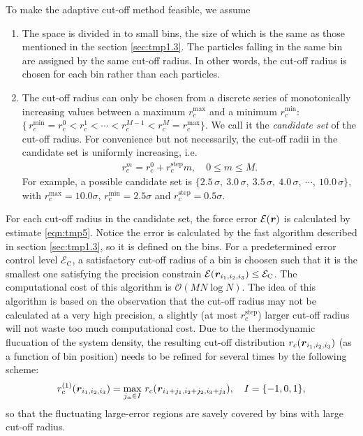 \documentclass[aps,pre,preprint]{revtex4}
\renewcommand{\v}[1]{\textbf{\textit{#1}}}
\begin{document}
To make the adaptive cut-off method feasible, we assume
\begin{enumerate}
\item The space is divided in to small bins, the size of which is the
  same as those mentioned in the section \ref{sec:tmp1.3}.  The
  particles falling in the same bin are assigned by the same cut-off
  radius. In other words, the cut-off radius is chosen for each bin
  rather than each particles.
\item The cut-off radius can only be chosen from a discrete series of
  monotonically increasing values between a maximum 
  $r_c^{\textrm{max}}$ and a minimum 
  $r_c^{\textrm{min}}$: $\{\,r_c^{\textrm{min}} = r_c^0 < r_c^1 <
  \cdots < r_c^{M-1} <r_c^M = r_c^{\textrm{max}}\}$.  We call it the
  \emph{candidate set} of the cut-off radius.  For convenience but not
  necessarily, the cut-off radii in the candidate set is uniformly increasing, i.e.
  \begin{align}
    r_c^m = r_c^0 + r_c^{\textrm{step}} m, \quad 0 \leq m \leq M.
  \end{align}
  For example, a possible candidate set is $\{2.5\,\sigma,\
  3.0\,\sigma,\ 3.5\,\sigma,\ 4.0\,\sigma,\ \cdots,\ 10.0\,\sigma\}$,
  with $r_c^{\textrm{max}} = 10.0\sigma$, $r_c^{\textrm{min}} =
  2.5\sigma$ and $r_c^{\textrm{step}} = 0.5 \sigma$.
\end{enumerate}
For each cut-off radius in the candidate set, the force error
$\mathcal E(\v r)$ is calculated by estimate
\eqref{eqn:tmp5}. Notice the error is calculated by the
fast algorithm described in section \ref{sec:tmp1.3}, so it is
defined on the bins.  For a predetermined error control level
$\mathcal E_{\textrm{C}}$, a satisfactory cut-off radius of a bin is
choosen such that it is the smallest one satisfying the precision
constrain $\mathcal E(\v r_{i_1,i_2,i_3}) \leq \mathcal
E_{\textrm{C}}$. The computational cost of this algorithm is $\mathcal
O(MN\log N)$.  The idea of this algorithm is based on the observation
that the cut-off radius may not be calculated at a very high
precision, a slightly (at most $r_c^{\textrm{step}}$) larger
cut-off radius will not waste too much computational cost.  Due to the
thermodynamic flucuation of the system density, the resulting cut-off
distribution $r_c(\v r_{i_1,i_2,i_3})$ (as a function of bin
position) needs to be refined for several times by the following scheme:
\begin{align}\label{eqn:rc-refine}
  r^{(1)}_c(\v r_{i_1,i_2,i_3}) = \max_{j_\alpha\in I}\,r_c(\v r_{i_1+j_1,i_2+j_2,i_3+j_3}),
  \quad I = \{-1, 0, 1\},
\end{align}
so that the fluctuating large-error regions are savely covered by bins
with large cut-off radius.
\end{document}
